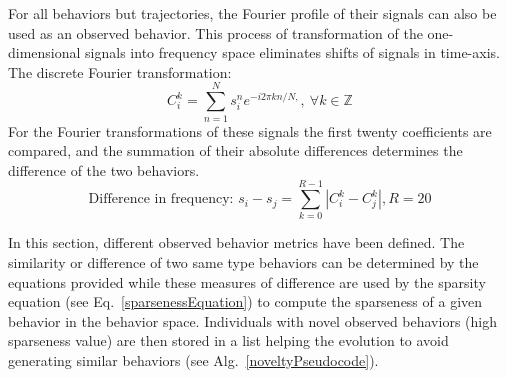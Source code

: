 For all behaviors but trajectories, the Fourier profile of their signals can also be used as an observed behavior. This process of transformation of the one-dimensional signals into frequency space eliminates shifts of signals in time-axis. The discrete Fourier transformation:
\begin{equation}
C_i^k = \sum_{n=1}^{N} s_i^n e^{-i 2 \pi k n/N,},~\forall k \in \mathbb{Z}
\end{equation}
For the Fourier transformations of these signals the first twenty coefficients are compared, and the summation of their absolute differences determines the difference of the two behaviors.
\begin{equation}
\text{Difference in frequency: } s_i - s_j = \sum_{k=0}^{R-1} | C_i^k - C_j^k |, R=20
\end{equation}

In this section, different observed behavior metrics have been defined. The similarity or difference of two same type behaviors can be determined by the equations provided while these measures of difference are used by the sparsity equation (see Eq.~\ref{sparsenessEquation}) to compute the sparseness of a given behavior in the behavior space. Individuals with novel observed behaviors (high sparseness value) are then stored in a list helping the evolution to avoid generating similar behaviors (see Alg.~\ref{noveltyPseudocode}).
